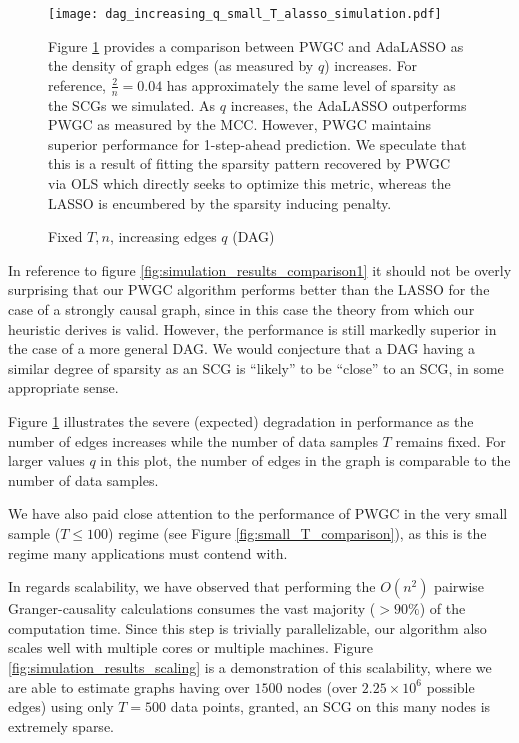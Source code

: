 \documentclass{statsoc}
\begin{document}
\begin{figure}
  \caption{Fixed $T, n$, increasing edges $q$ (DAG)}
  \label{fig:simulation_results_dense}
  \texttt{[image: dag\_increasing\_q\_small\_T\_alasso\_simulation.pdf]}

  {\footnotesize Figure \ref{fig:simulation_results_dense} provides a
    comparison between PWGC and AdaLASSO as the density of graph edges
    (as measured by $q$) increases.  For reference,
    $\frac{2}{n} = 0.04$ has approximately the same level of sparsity
    as the SCGs we simulated.  As $q$ increases, the AdaLASSO
    outperforms PWGC as measured by the MCC.  However, PWGC maintains
    superior performance for 1-step-ahead prediction.  We speculate
    that this is a result of fitting the sparsity pattern recovered by
    PWGC via OLS which directly seeks to optimize this metric, whereas
    the LASSO is encumbered by the sparsity inducing penalty.}
\end{figure}

In reference to figure \ref{fig:simulation_results_comparison1} it
should not be overly surprising that our PWGC algorithm performs
better than the LASSO for the case of a strongly causal graph, since
in this case the theory from which our heuristic derives is valid.
However, the performance is still markedly superior in the case of a
more general DAG.  We would conjecture that a DAG having a similar
degree of sparsity as an SCG is ``likely'' to be ``close'' to an SCG,
in some appropriate sense.

Figure \ref{fig:simulation_results_dense} illustrates the severe
(expected) degradation in performance as the number of edges increases
while the number of data samples $T$ remains fixed.  For larger values
$q$ in this plot, the number of edges in the graph is comparable to
the number of data samples.

We have also paid close attention to the performance of PWGC in the
very small sample ($T \le 100$) regime (see Figure
\ref{fig:small_T_comparison}), as this is the regime many applications
must contend with.

In regards scalability, we have observed that performing the $O(n^2)$
pairwise Granger-causality calculations consumes the vast majority
($> 90\%$) of the computation time.  Since this step is trivially
parallelizable, our algorithm also scales well with multiple cores or
multiple machines.  Figure \ref{fig:simulation_results_scaling} is a
demonstration of this scalability, where we are able to estimate
graphs having over $1500$ nodes (over $2.25 \times 10 ^6$ possible edges)
using only $T = 500$ data points, granted, an SCG on this many nodes
is extremely sparse.

\clearpage
% 

\end{document}
